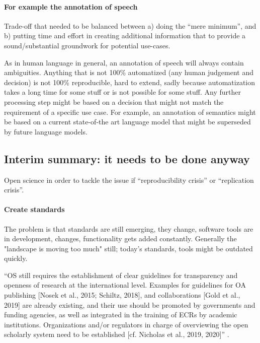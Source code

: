 \paragraph{For example the annotation of speech}


Trade-off that needed to be balanced between
%
a) doing the ``mere minimum'', and
%
b) putting time and effort in creating additional information that to provide a
sound/substantial groundwork for potential use-cases.

%
As in human language in general, an annotation of speech will always contain
ambiguities.
%
Anything that is not 100\% automatized (any human judgement and decision) is not
100\% reproducible, hard to extend, sadly because automatization takes a long
time for some stuff or is not possible for some stuff.
%
Any further processing step might be based on a decision that might not match
the requirement of a specific use case.
%
For example, an annotation of semantics might be based on a current state-of-the
art language model that might be superseded by future language models.


\pagebreak


\subsection{Interim summary: it needs to be done anyway}


%
Open science in order to tackle the issue if ``reproducibility crisis'' or
``replication crisis''.

\paragraph{Create standards}
%
The problem is that standards are still emerging, they change, software tools
are in development, changes, functionality gets added constantly.
%
Generally the "landscape is moving too much" still; today's standards, tools
might be outdated quickly.

%
``OS still requires the establishment of clear guidelines for transparency and
openness of research at the international level.
%
Examples for guidelines for OA publishing [Nosek et al., 2015; Schiltz, 2018],
and collaborations [Gold et al., 2019] are already existing, and their use
should be promoted by governments and funding agencies, as well as integrated in
the training of ECRs by academic institutions.
%
Organizations and/or regulators in charge of overviewing the open scholarly
system need to be established [cf. Nicholas et al., 2019, 2020]''
\citep{toribio2021early}.



